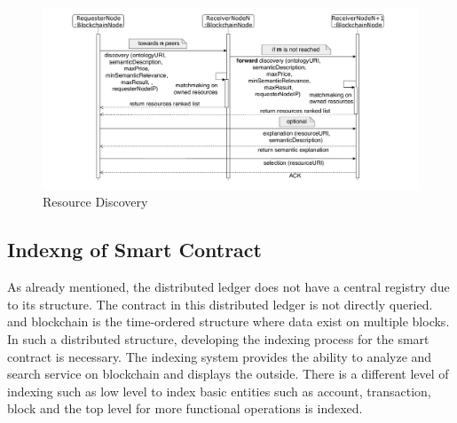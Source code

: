 \begin{center}
	\begin{figure}[htb!]
		
		\begin{minipage}{0.55\linewidth}
			\centering
			\includegraphics[width=1.95\textwidth]{images/chap01_SemanticBlockChain.png}
		\end{minipage}
		\caption[Resourse Discovery]{Resource Discovery\cite{Ruta}}
		
	\end{figure}
	
\end{center}

\subsection{Indexng of Smart Contract}
As already mentioned, the distributed ledger does not have a central registry due to its structure. The contract in this distributed ledger is not directly queried.
and blockchain is the time-ordered structure where data exist on multiple blocks.
In such a distributed structure, developing the indexing process for the smart contract is necessary. The indexing system provides the ability to analyze and search service on blockchain and displays the outside.
There is a different level of indexing such as low level to index basic entities such as account, transaction, block and the top level for more functional operations is indexed.

